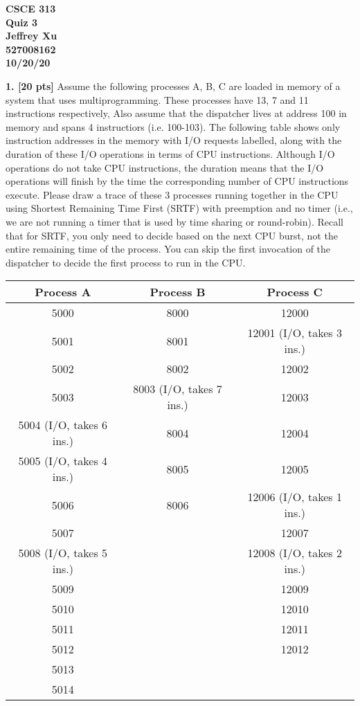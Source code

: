 \documentclass[12pt]{article}
\begin{document}
\begin{center}

{\bf
CSCE 313\\
Quiz 3\\
Jeffrey Xu\\
527008162\\
10/20/20\\
}

\end{center}

{\bf 1. [20 pts]} Assume the following processes A, B, C are loaded in memory of a system that uses multiprogramming. These processes have 13, 7 and 11 instructions respectively, Also assume that the dispatcher lives at address 100 in memory and spans 4 instructiors (i.e. 100-103). The following table shows only instruction addresses in the memory with I/O requests labelled, along with the duration of these I/O operations in terms of CPU instructions. Although I/O operations do not take CPU instructions, the duration means that the I/O operations will finish by the time the corresponding number of CPU instructions execute. Please draw a trace of these 3 processes running together in the CPU using Shortest Remaining Time First (SRTF) with preemption and no timer (i.e., we are not running a timer that is used by time sharing or round-robin). Recall that for SRTF, you only need to decide based on the next CPU burst, not the entire remaining time of the process. You can skip the first invocation of the dispatcher to decide the first process to run in the CPU.

\begin{center}
\begin{tabular}{| c | c | c |}
\hline
{\bf Process A} & {\bf Process B} & {\bf Process C}\\
\hline\hline
5000 & 8000 & 12000\\
\hline
5001 & 8001 & 12001 (I/O, takes 3 ins.)\\
\hline
5002 & 8002 & 12002\\
\hline
5003 & 8003 (I/O, takes 7 ins.) & 12003\\
\hline
5004 (I/O, takes 6 ins.) & 8004 & 12004\\
\hline
5005 (I/O, takes 4 ins.) & 8005 & 12005\\
\hline
5006 & 8006 & 12006 (I/O, takes 1 ins.)\\
\hline
5007 & & 12007\\
\hline
5008 (I/O, takes 5 ins.) & & 12008 (I/O, takes 2 ins.)\\
\hline
5009 & & 12009\\
\hline
5010 & & 12010\\
\hline
5011 & & 12011\\
\hline
5012 & & 12012\\
\hline
5013 & & \\
\hline
5014 & & \\
\hline
\end{tabular}
\end{center}
\end{document}
